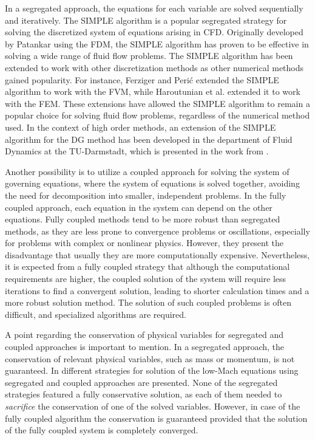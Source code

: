 In a segregated approach, the equations for each variable are solved sequentially and iteratively. The \gls{SIMPLE} algorithm is a popular segregated strategy for solving the discretized system of equations arising in \gls{CFD}. Originally developed by Patankar \parencite{patankarNumericalHeatTransfer1980} using the \gls{FDM}, the SIMPLE algorithm has proven to be effective in solving a wide range of fluid flow problems. The SIMPLE algorithm has been extended to work with other discretization methods as other numerical methods gained popularity. For instance, Ferziger and Perić \parencite{ferzigerComputationalMethodsFluid2002} extended the SIMPLE algorithm to work with the \gls{FVM}, while Haroutunian et al. \parencite{haroutunianSegregatedFiniteElement1993} extended it to work with the \gls{FEM}. These extensions have allowed the SIMPLE algorithm to remain a popular choice for solving fluid flow problems, regardless of the numerical method used. In the context of high order methods, an extension of the SIMPLE algorithm for the DG method has been developed in the department of Fluid Dynamics at the TU-Darmstadt, which is presented in the work from \textcite{kleinHighorderDiscontinuousGalerkin2015}. 

Another possibility is to utilize a coupled approach for solving the system of governing equations, where the system of equations is solved together, avoiding the need for decomposition into smaller, independent problems. In the fully coupled approach, each equation in the system can depend on the other equations. Fully coupled methods tend to be more robust than segregated methods, as they are less prone to convergence problems or oscillations, especially for problems with complex or nonlinear physics. However, they present the disadvantage that usually they are more computationally expensive. Nevertheless, it is expected from a fully coupled strategy that although the computational requirements are higher, the coupled solution of the system will require less iterations to find a convergent solution, leading to shorter calculation times and a more robust solution method.  The solution of such coupled problems is often difficult, and specialized algorithms are required. 

A point regarding the conservation of physical variables for segregated and coupled approaches is important to mention. In a segregated approach, the conservation of relevant physical variables, such as mass or momentum, is not guaranteed. In \textcite{knikkerComparativeStudyHighorder2011} different strategies for solution of the low-Mach equations using segregated and coupled approaches are presented. None of the segregated strategies featured a fully conservative solution, as each of them needed to \textit{sacrifice} the conservation of one of the solved variables. However, in case of the fully coupled algorithm the conservation is guaranteed provided that the solution of the fully coupled system is completely converged.

